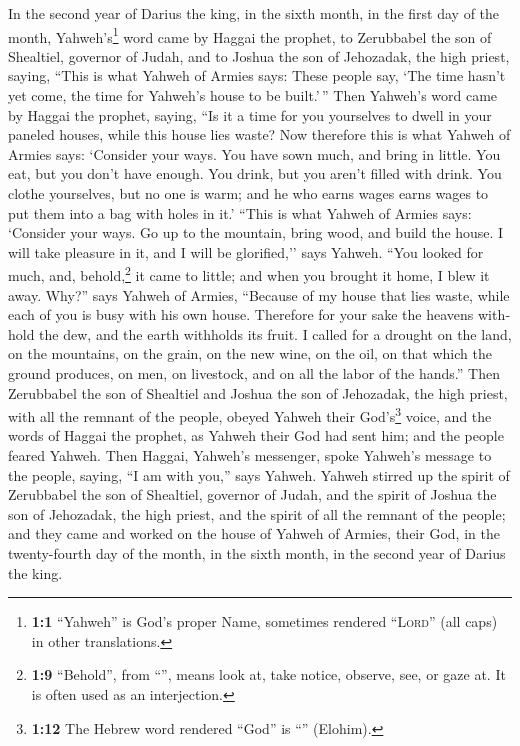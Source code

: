 \begin{paracol}{2}
\begin{otherlanguage}{english}
 In the second year of Darius the king, in the sixth
month, in the first day of the month, Yahweh's\footnote{\textbf{1:1}
  ``Yahweh'' is God's proper Name, sometimes rendered ``\textsc{Lord}''
  (all caps) in other translations.} word came by Haggai the prophet, to
Zerubbabel the son of Shealtiel, governor of Judah, and to Joshua the
son of Jehozadak, the high priest, saying,  ``This is what
Yahweh of Armies says: These people say, `The time hasn't yet come, the
time for Yahweh's house to be built.'\,''  Then Yahweh's
word came by Haggai the prophet, saying,  ``Is it a time
for you yourselves to dwell in your paneled houses, while this house
lies waste?  Now therefore this is what Yahweh of Armies
says: `Consider your ways.  You have sown much, and bring
in little. You eat, but you don't have enough. You drink, but you aren't
filled with drink. You clothe yourselves, but no one is warm; and he who
earns wages earns wages to put them into a bag with holes in it.'
 ``This is what Yahweh of Armies says: `Consider your
ways.  Go up to the mountain, bring wood, and build the
house. I will take pleasure in it, and I will be glorified,'' says
Yahweh.  ``You looked for much, and, behold,\footnote{\textbf{1:9}
  ``Behold'', from ``'', means look at, take notice,
  observe, see, or gaze at. It is often used as an interjection.} it
came to little; and when you brought it home, I blew it away. Why?''
says Yahweh of Armies, ``Because of my house that lies waste, while each
of you is busy with his own house.  Therefore for your
sake the heavens withhold the dew, and the earth withholds its fruit.
 I called for a drought on the land, on the mountains, on
the grain, on the new wine, on the oil, on that which the ground
produces, on men, on livestock, and on all the labor of the hands.''
 Then Zerubbabel the son of Shealtiel and Joshua the son
of Jehozadak, the high priest, with all the remnant of the people,
obeyed Yahweh their God's\footnote{\textbf{1:12} The Hebrew word
  rendered ``God'' is ``'' (Elohim).} voice, and the words
of Haggai the prophet, as Yahweh their God had sent him; and the people
feared Yahweh.  Then Haggai, Yahweh's messenger, spoke
Yahweh's message to the people, saying, ``I am with you,'' says Yahweh.
 Yahweh stirred up the spirit of Zerubbabel the son of
Shealtiel, governor of Judah, and the spirit of Joshua the son of
Jehozadak, the high priest, and the spirit of all the remnant of the
people; and they came and worked on the house of Yahweh of Armies, their
God,  in the twenty-fourth day of the month, in the sixth
month, in the second year of Darius the king.


\end{otherlanguage}
\end{paracol}
